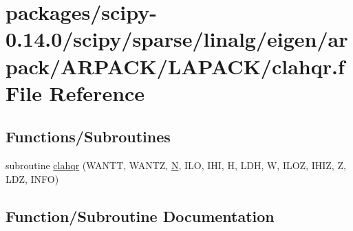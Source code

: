 \hypertarget{scipy-0_814_80_2scipy_2sparse_2linalg_2eigen_2arpack_2ARPACK_2LAPACK_2clahqr_8f}{}\section{packages/scipy-\/0.14.0/scipy/sparse/linalg/eigen/arpack/\+A\+R\+P\+A\+C\+K/\+L\+A\+P\+A\+C\+K/clahqr.f File Reference}
\label{scipy-0_814_80_2scipy_2sparse_2linalg_2eigen_2arpack_2ARPACK_2LAPACK_2clahqr_8f}
\subsection*{Functions/\+Subroutines}
\begin{DoxyCompactItemize}
\item 
subroutine \hyperlink{scipy-0_814_80_2scipy_2sparse_2linalg_2eigen_2arpack_2ARPACK_2LAPACK_2clahqr_8f_adcbbd5854890ff535070cb8477b9dfb6}{clahqr} (W\+A\+N\+T\+T, W\+A\+N\+T\+Z, \hyperlink{polmisc_8c_a0240ac851181b84ac374872dc5434ee4}{N}, I\+L\+O, I\+H\+I, H, L\+D\+H, W, I\+L\+O\+Z, I\+H\+I\+Z, Z, L\+D\+Z, I\+N\+F\+O)
\end{DoxyCompactItemize}


\subsection{Function/\+Subroutine Documentation}
\hypertarget{scipy-0_814_80_2scipy_2sparse_2linalg_2eigen_2arpack_2ARPACK_2LAPACK_2clahqr_8f_adcbbd5854890ff535070cb8477b9dfb6}{}
